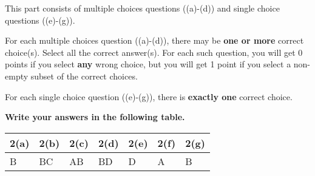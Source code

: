 
This part consists of multiple choices questions ((a)-(d)) and single choice questions ((e)-(g)).

For each multiple choices question ((a)-(d)), there may be \textbf{one or more} correct choice(s). Select all the correct answer(s). For each such question, you will get 0 points if you select \textbf{any} wrong choice, but you will get 1 point if you select a non-empty subset of the correct choices.

For each single choice question ((e)-(g)), there is \textbf{exactly one} correct choice.

\textbf{Write your answers in the following table.}


\begin{table}[htbp]
    \centering
    \begin{tabular}{|p{2cm}|p{2cm}|p{2cm}|p{2cm}|p{1cm}|p{1cm}|p{1cm}|}
        \hline
        2(a) & 2(b) & 2(c) & 2(d) & 2(e) & 2(f) & 2(g) \\
        \hline
        B    & BC   & AB   & BD   & D    & A    & B    \\
        \hline
    \end{tabular}
\end{table}

